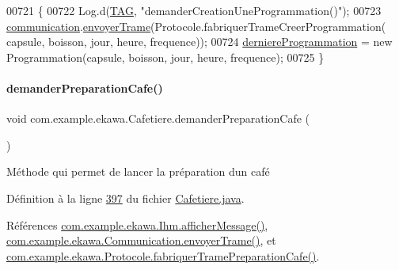 \begin{DoxyCode}
00721     \{
00722         Log.d(\hyperlink{classcom_1_1example_1_1ekawa_1_1_cafetiere_aa0c1fd99a2508b06c462aea17034aa91}{TAG}, \textcolor{stringliteral}{"demanderCreationUneProgrammation()"});
00723         \hyperlink{classcom_1_1example_1_1ekawa_1_1_cafetiere_af9506a7805d000d2cb83444cdb8ea889}{communication}.\hyperlink{classcom_1_1example_1_1ekawa_1_1_communication_a98808d0236e547b9a3ee485f66aa7af0}{envoyerTrame}(Protocole.fabriquerTrameCreerProgrammation(
      capsule, boisson, jour, heure, frequence));
00724         \hyperlink{classcom_1_1example_1_1ekawa_1_1_cafetiere_ae5fa359f1ddcbd80ce3651e2d7368ff8}{derniereProgrammation} = \textcolor{keyword}{new} Programmation(capsule, boisson, jour, heure, 
      frequence);
00725     \}
\end{DoxyCode}
\mbox{\label{classcom_1_1example_1_1ekawa_1_1_cafetiere_a76eb3aa494815ac3b43371e21de21db3}} 
\paragraph{\texorpdfstring{demander\+Preparation\+Cafe()}{demanderPreparationCafe()}}
{\footnotesize\ttfamily void com.\+example.\+ekawa.\+Cafetiere.\+demander\+Preparation\+Cafe (\begin{DoxyParamCaption}{ }\end{DoxyParamCaption})}



Méthode qui permet de lancer la préparation d\textquotesingle{}un café 



Définition à la ligne \hyperlink{_cafetiere_8java_source_l00397}{397} du fichier \hyperlink{_cafetiere_8java_source}{Cafetiere.\+java}.



Références \hyperlink{_ihm_8java_source_l00964}{com.\+example.\+ekawa.\+Ihm.\+afficher\+Message()}, \hyperlink{_communication_8java_source_l00309}{com.\+example.\+ekawa.\+Communication.\+envoyer\+Trame()}, et \hyperlink{_protocole_8java_source_l00099}{com.\+example.\+ekawa.\+Protocole.\+fabriquer\+Trame\+Preparation\+Cafe()}.



